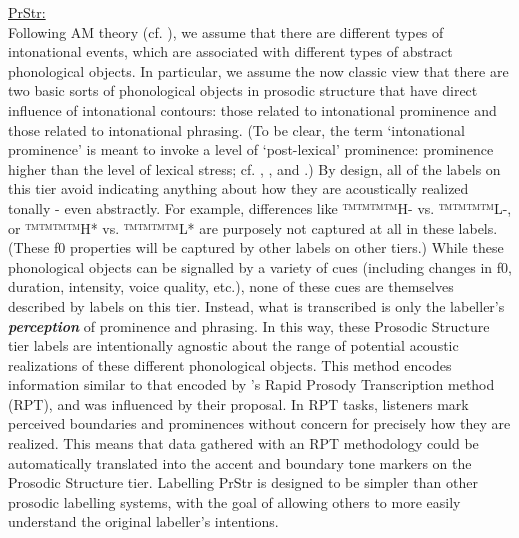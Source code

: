 \documentclass[11pt, twoside]{memoir}
\begin{document}
\uline{PrStr:}\\ Following AM theory (cf. \citealt{pierrehumbert80}), we assume that there are different types of intonational events, which are associated with different types of abstract phonological objects. In particular, we assume the now classic view that there are two basic sorts of phonological objects in prosodic structure that have direct influence of intonational contours: those related to intonational prominence and those related to intonational phrasing. (To be clear, the term ‘intonational prominence’ is meant to invoke a level of ‘post-lexical’ prominence: prominence higher than the level of lexical stress; cf. \citealt{bolinger58}, \citealt{libermanprince77}, and \citealt{beckmanedwards94}.) By design, all of the labels on this tier avoid indicating anything about how they are acoustically realized tonally - even abstractly. For example, differences like ™™™™{H-} vs. ™™™™{L-}, or ™™™™{H*} vs. ™™™™{L*} are purposely not captured at all in these labels. (These f0 properties will be captured by other labels on other tiers.) While these phonological objects can be signalled by a variety of cues (including changes in f0, duration, intensity, voice quality, etc.), none of these cues are themselves described by labels on this tier. Instead, what is transcribed is only the labeller’s \textit{\textbf{perception}} of prominence and phrasing. In this way, these Prosodic Structure tier labels are intentionally agnostic about the range of potential acoustic realizations of these different phonological objects. This method encodes information similar to that encoded by \citeauthor{cole-14}’s \citeyear{cole-14} Rapid Prosody Transcription method (RPT), and was influenced by their proposal. In RPT tasks, listeners mark perceived boundaries and prominences without concern for precisely how they are realized. This means that data gathered with an RPT methodology could be automatically translated into the accent and boundary tone markers on the Prosodic Structure tier. Labelling PrStr is designed to be simpler than other prosodic labelling systems, with the goal of allowing others to more easily understand the original labeller’s intentions.
\end{document}
